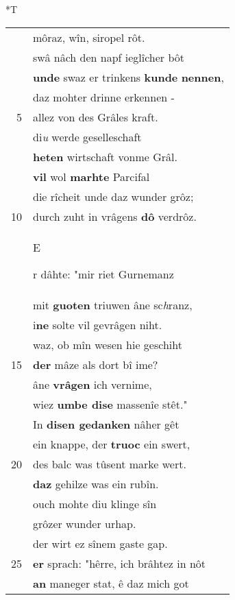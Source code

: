 \documentclass[8pt,a4paper,notitlepage]{article}
\begin{document}
\begin{table}[ht]
\begin{minipage}[t]{0.5\linewidth}
\end{minipage}
\hspace{0.5cm}
\begin{minipage}[t]{0.5\linewidth}
\small
\begin{center}*T
\end{center}
\begin{tabular}{rl}
 & môraz, wîn, siropel rôt.\\ 
 & swâ nâch den napf ieglîcher bôt\\ 
 & \textbf{unde} swaz er trinkens \textbf{kunde} \textbf{nennen},\\ 
 & daz mohter drinne erkennen -\\ 
5 & allez von des Grâles kraft.\\ 
 & di\textit{u} werde geselleschaft\\ 
 & \textbf{heten} wirtschaft vonme Grâl.\\ 
 & \textbf{vil} wol \textbf{marhte} Parcifal\\ 
 & die rîcheit unde daz wunder grôz;\\ 
10 & durch zuht in vrâgens \textbf{dô} verdrôz.\\ 
 & \begin{large}E\end{large}r dâhte: "mir riet Gurnemanz\\ 
 & mit \textbf{guoten} triuwen âne sc\textit{h}ranz,\\ 
 & i\textbf{ne} solte vil gevrâgen niht.\\ 
 & waz, ob mîn wesen hie geschiht\\ 
15 & \textbf{der} mâze als dort bî ime?\\ 
 & âne \textbf{vrâgen} ich vernime,\\ 
 & wiez \textbf{umbe dise} massenîe stêt."\\ 
 & In \textbf{disen gedanken} nâher gêt\\ 
 & ein knappe, der \textbf{truoc} ein swert,\\ 
20 & des balc was tûsent marke wert.\\ 
 & \textbf{daz} gehilze was ein rubîn.\\ 
 & ouch mohte diu klinge sîn\\ 
 & grôzer wunder urhap.\\ 
 & der wirt ez sînem gaste gap.\\ 
25 & \textbf{er} sprach: "hêrre, ich brâhtez in nôt\\ 
 & \textbf{an} maneger stat, ê daz mich got\\ 

\end{tabular}
\end{minipage}
\end{table}
\end{document}
